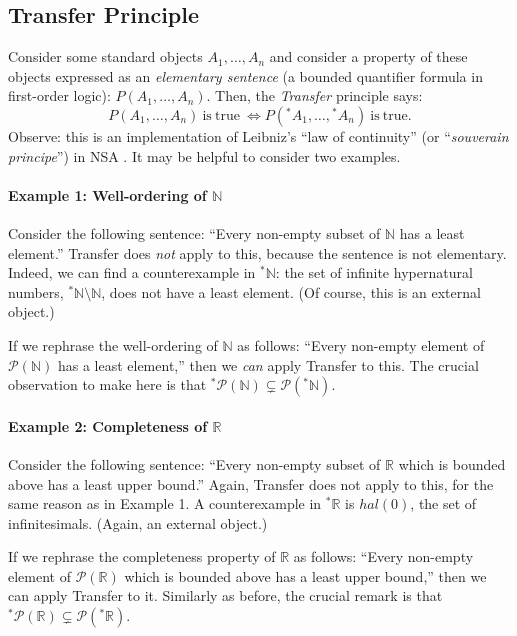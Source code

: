 \subsection{Transfer Principle}
Consider some standard objects $A_1,\ldots,A_n$ and consider a property of these objects expressed as an \textit{elementary sentence} (a bounded quantifier formula in first-order logic): $P(A_1,\ldots,A_n)$.
Then, the \textit{Transfer} principle says:
$$
P(A_1,\ldots,A_n) \mathrm{\ is\ true\ } \Leftrightarrow P({^\ast A}_1,\ldots,{^\ast A}_n) \mathrm{\ is\ true}.
$$
Observe: this is an implementation of Leibniz's ``law of continuity'' (or ``\textit{souverain principe}'') in NSA \citep[see][section~4.3]{KatzSherry:2012a}. It may be helpful to consider two examples.

\paragraph{Example 1: Well-ordering of $\mathbb{N}$}
Consider the following sentence: ``Every non-empty subset of $\mathbb{N}$ has a least element.'' Transfer does \emph{not} apply to this, because the sentence is not elementary. Indeed, we can find a counterexample in ${^\ast \mathbb{N}}$: the set of infinite hypernatural numbers, ${^\ast \mathbb{N}} \setminus \mathbb{N}$, does not have a least element. (Of course, this is an external object.)

If we rephrase the well-ordering of $\mathbb{N}$ as follows: ``Every non-empty element of $\mathcal{P}(\mathbb{N})$ has a least element,'' then we \emph{can} apply Transfer to this.
The crucial observation to make here is that ${^\ast \mathcal{P}}(\mathbb{N}) \subsetneq \mathcal{P}({^\ast \mathbb{N}})$.

\paragraph{Example 2: Completeness of $\mathbb{R}$}
Consider the following sentence: ``Every non-empty subset of $\mathbb{R}$ which is bounded above has a least upper bound.'' Again, Transfer does not apply to this, for the same reason as in Example 1. A counterexample in ${^\ast \mathbb{R}}$ is $hal(0)$, the set of infinitesimals. (Again, an external object.)

If we rephrase the completeness property of $\mathbb{R}$ as follows: ``Every non-empty element of $\mathcal{P}(\mathbb{R})$ which is bounded above has a least upper bound,'' then we can apply Transfer to it. Similarly as before, the crucial remark is that ${^\ast \mathcal{P}}(\mathbb{R}) \subsetneq \mathcal{P}({^\ast \mathbb{R}})$.

